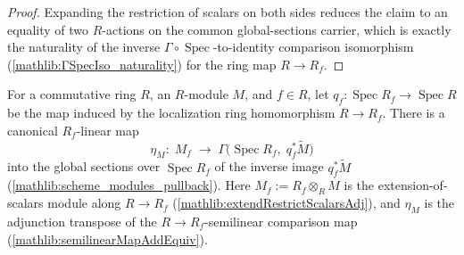 \begin{proof}
  \leanok
  Expanding the restriction of scalars on both sides reduces the claim to an equality of
  two \(R\)-actions on the common global-sections carrier, which is exactly the naturality
  of the inverse \(\Gamma\circ\operatorname{Spec}\)-to-identity comparison isomorphism
  (\cref{mathlib:ΓSpecIso_naturality}) for the ring map \(R\to R_f\).
\end{proof}

\begin{lemma}
  \label{found:tilde_pullback_globalSections}
  \leanok
  For a commutative ring \(R\), an \(R\)-module \(M\), and \(f\in R\), let
  \(q_f:\operatorname{Spec}R_f\to\operatorname{Spec}R\) be the map induced by the
  localization ring homomorphism \(R\to R_f\).  There is a canonical
  \(R_f\)-linear map
  \[
    \eta_M:\;M_f\;\longrightarrow\;
    \Gamma\bigl(\operatorname{Spec}R_f,\;q_f^{*}\widetilde M\bigr)
  \]
  into the global sections over \(\operatorname{Spec}R_f\) of the inverse image
  \(q_f^{*}\widetilde M\) (\cref{mathlib:scheme_modules_pullback}).  Here
  \(M_f:=R_f\otimes_R M\) is the extension-of-scalars module along \(R\to R_f\)
  (\cref{mathlib:extendRestrictScalarsAdj}), and \(\eta_M\) is the adjunction transpose
  of the \(R\to R_f\)-semilinear comparison map (\cref{mathlib:semilinearMapAddEquiv}).
\end{lemma}

